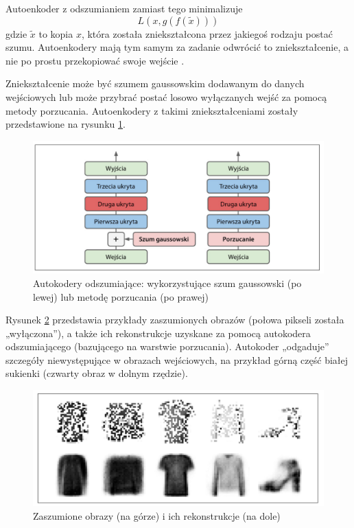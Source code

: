 \documentclass[12pt]{mwbk}
\theoremstyle{plain}
\theoremstyle{definition}
\theoremstyle{remark}
\newcommand\zrodlo[1]{\par\vspace{-3mm}{\small\textit{Źródło: }#1 }}
\begin{document}
Autoenkoder z odszumianiem zamiast tego minimalizuje
$$L(x, g(f(\tilde{x})))$$
gdzie $\tilde{x}$ to kopia $x$, która została zniekształcona przez jakiegoś rodzaju postać szumu. Autoenkodery mają tym samym za zadanie odwrócić to zniekształcenie, a nie po prostu przekopiować swoje wejście \cite{goodfellow}.

Zniekształcenie może być szumem gaussowskim dodawanym do danych wejściowych lub może przybrać postać losowo wyłączanych wejść za pomocą metody porzucania. Autoenkodery z takimi zniekształceniami zostały przedstawione na rysunku \ref{fig:autoenkoder-odszumiajacy}.





\begin{figure}[!h]
	\centering
	\includegraphics[width=\linewidth]{rys/autoenkoder_odszumiajacy.png}
	\caption{Autokodery odszumiające: wykorzystujące szum gaussowski (po lewej) lub metodę porzucania
		(po prawej)}
	\zrodlo{\cite{geron}}
	\label{fig:autoenkoder-odszumiajacy}
\end{figure}


Rysunek \ref{fig:autoenkoder-denoising} przedstawia przykłady zaszumionych obrazów (połowa pikseli została „wyłączona”), a także ich rekonstrukcje uzyskane za pomocą autokodera odszumiającego (bazującego na warstwie porzucania). Autokoder  „odgaduje” szczegóły niewystępujące w obrazach wejściowych, na przykład górną część białej sukienki (czwarty obraz w dolnym rzędzie). 

\begin{figure}[!h]
	\centering
	\includegraphics[width=\linewidth]{rys/denoising.png}
	\caption{Zaszumione obrazy (na górze) i ich rekonstrukcje (na dole)}
	\zrodlo{\cite{geron}}
	\label{fig:autoenkoder-denoising}
\end{figure}
\end{document}
